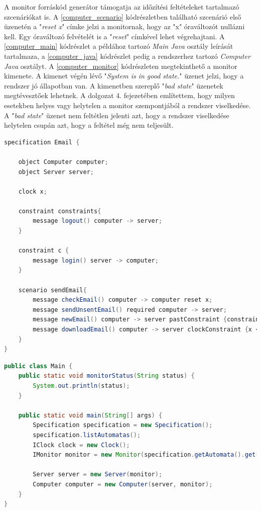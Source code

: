 A monitor forráskód generátor támogatja az időzítési feltételeket tartalmazó szcenáriókat is.
A \ref{computer_scenario} kódrészletben található szcenárió első üzenetén a "\textit{reset x}" címke jelzi a monitornak, hogy az "x" óraváltozót nullázni kell.
Egy óraváltozó felvételét is a "\textit{reset}" címkével lehet végrehajtani.
A \ref{computer_main} kódrészlet a példához tartozó \textit{Main} \textit{Java} osztály leírását tartalmaza, a \ref{computer_java} kódrészlet pedig a rendszerhez tartozó \textit{Computer} \textit{Java} osztályt.
A \ref{computer_monitor} kódrészleten megtekinthető a monitor kimenete.
A kimenet végén lévő "\textit{System is in good state.}" üzenet jelzi, hogy a rendszer jó állapotban van.
A kimenetben szereplő "\textit{bad state}" üzenetek megtévesztőek lehetnek.
A dolgozat 4. fejezetében említettem, hogy milyen esetekben helyes vagy helytelen a monitor szempontjából a rendszer viselkedése.
A "\textit{bad state}" üzenet nem feltétlen jelenti azt, hogy a rendszer viselkedése helytelen csupán azt, hogy a feltétel még nem teljesült.

\begin{lstlisting}[language=java, frame=single, float=ht!, caption={Időzítési feltételeket tartalmazó szcenárió},captionpos=b,label=computer_scenario]
specification Email {

	object Computer computer;
	object Server server;

	clock x;

	constraint constraints{
		message logout() computer -> server;
	}

	constraint c {
		message login() server -> computer;
	}

	scenario sendEmail{
		message checkEmail() computer -> computer reset x;
		message sendUnsentEmail() required computer -> server;
		message newEmail() computer -> server pastConstraint {constraints};
		message downloadEmail() computer -> server clockConstraint {x < 10};
	}
}
\end{lstlisting}

\begin{lstlisting}[language=java, frame=single, float=ht!, caption={Időzítéses példához tartozó Main osztály.},captionpos=b,label=computer_main]
public class Main {
	public static void monitorStatus(String status) {
		System.out.println(status);
	}

	public static void main(String[] args) {
		Specification specification = new Specification();
		specification.listAutomatas();
		IClock clock = new Clock();
		IMonitor monitor = new Monitor(specification.getAutomata().get(0), clock);

		Server server = new Server(monitor);
		Computer computer = new Computer(server, monitor);
	}
}
\end{lstlisting}

